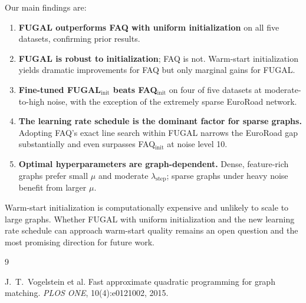 \documentclass[11pt,a4paper]{article}
\newcommand{\muval}{\mu}
\newcommand{\lams}{\lambda_{\text{step}}}
\begin{document}
Our main findings are:

\begin{enumerate}
  \item \textbf{FUGAL outperforms FAQ with uniform initialization} on all five datasets, confirming prior results.

  \item \textbf{FUGAL is robust to initialization}; FAQ is not.  Warm-start initialization yields dramatic improvements for FAQ but only marginal gains for FUGAL.

  \item \textbf{Fine-tuned FUGAL$_{\text{init}}$ beats FAQ$_{\text{init}}$} on four of five datasets at moderate-to-high noise, with the exception of the extremely sparse EuroRoad network.

  \item \textbf{The learning rate schedule is the dominant factor for sparse graphs.}  Adopting FAQ's exact line search within FUGAL narrows the EuroRoad gap substantially and even surpasses FAQ$_{\text{init}}$ at noise level 10.

  \item \textbf{Optimal hyperparameters are graph-dependent.}  Dense, feature-rich graphs prefer small $\muval$ and moderate $\lams$; sparse graphs under heavy noise benefit from larger $\muval$.
\end{enumerate}

Warm-start initialization is computationally expensive and unlikely to scale to large graphs.  Whether FUGAL with uniform initialization and the new learning rate schedule can approach warm-start quality remains an open question and the most promising direction for future work.



\begin{thebibliography}{9}


J.~T.~Vogelstein et al.
\newblock Fast approximate quadratic programming for graph matching.
\newblock \emph{PLOS ONE}, 10(4):e0121002, 2015.

\end{thebibliography}
\end{document}
